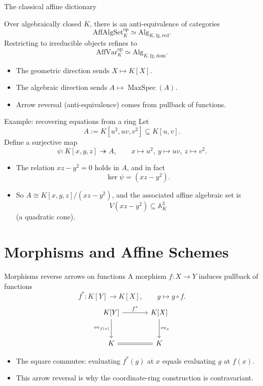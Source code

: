 \documentclass[10pt, aspectratio=169]{beamer}
\DeclareMathOperator{\MaxSpec}{MaxSpec}
\newcommand{\A}{\mathbb{A}}
\newcommand{\AffAlgSetK}{\mathrm{AffAlgSet}_K}
\newcommand{\AffVarK}{\mathrm{AffVar}_K}
\newcommand{\AlgKfgred}{\mathrm{Alg}_{K,\mathrm{fg},\mathrm{red}}}
\newcommand{\AlgKfgdom}{\mathrm{Alg}_{K,\mathrm{fg},\mathrm{dom}}}
\begin{document}
\begin{frame}{The classical affine dictionary}
    \begin{theorem}
        Over algebraically closed $K$, there is an anti-equivalence of categories
        \[
        \boxed{\AffAlgSetK^{\mathrm{op}} \simeq \AlgKfgred.}
        \]
        Restricting to irreducible objects refines to
        \[
        \AffVarK^{\mathrm{op}} \simeq \AlgKfgdom.
        \]
    \end{theorem}
    \begin{itemize}
        \item The geometric direction sends $X \mapsto K[X]$.
        \item The algebraic direction sends $A \mapsto \MaxSpec(A)$.
        \item Arrow reversal (anti-equivalence) comes from pullback of functions.
    \end{itemize}
\end{frame}

\begin{frame}{Example: recovering equations from a ring}
    Let
    \[
    A := K[u^2, uv, v^2] \subseteq K[u,v].
    \]
    Define a surjective map
    \[
    \psi : K[x,y,z] \twoheadrightarrow A,
    \qquad x \mapsto u^2,\ y \mapsto uv,\ z \mapsto v^2.
    \]
    \begin{itemize}
        \item The relation $xz - y^2 = 0$ holds in $A$, and in fact
        \[
        \ker\psi = (xz - y^2).
        \]
        \item So $A \cong K[x,y,z]/(xz-y^2)$, and the associated affine algebraic set is
        \[
        V(xz - y^2) \subseteq \A_K^3
        \]
        (a quadratic cone).
    \end{itemize}
\end{frame}

\section{Morphisms and Affine Schemes}

\begin{frame}[fragile]{Morphisms reverse arrows on functions}
    A morphism $f : X \to Y$ induces pullback of functions
    \[
    f^* : K[Y] \longrightarrow K[X],
    \qquad g \longmapsto g \circ f.
    \]
    \[
    \begin{tikzcd}[column sep=large, row sep=large]
        K[Y] \arrow[r, "f^*"] \arrow[d, "\mathrm{ev}_{f(x)}"'] & K[X] \arrow[d, "\mathrm{ev}_x"] \\
        K \arrow[r, equal] & K
    \end{tikzcd}
    \]
    \begin{itemize}
        \item The square commutes: evaluating $f^*(g)$ at $x$ equals evaluating $g$ at $f(x)$.
        \item This arrow reversal is why the coordinate-ring construction is contravariant.
    \end{itemize}
\end{frame}
\end{document}
